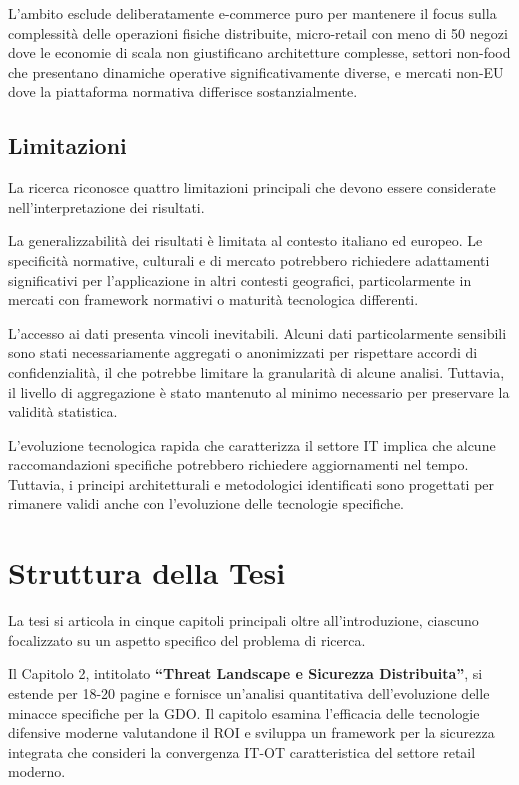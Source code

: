 \documentclass[12pt,a4paper,oneside]{book}
\numberwithin{figure}{chapter} %
\numberwithin{table}{chapter}  %
\begin{document}
L'ambito esclude deliberatamente e-commerce puro per mantenere il focus sulla complessità delle operazioni fisiche distribuite, micro-retail con meno di 50 negozi dove le economie di scala non giustificano architetture complesse, settori non-food che presentano dinamiche operative significativamente diverse, e mercati non-EU dove la piattaforma normativa differisce 
sostanzialmente.
\subsection{\texorpdfstring{\textbf{
Limitazioni}}{1.6.2 Limitazioni}}\label{limitazioni}

La ricerca riconosce quattro limitazioni principali che devono essere
considerate nell'interpretazione dei risultati.

La generalizzabilità dei risultati è limitata al contesto italiano ed
europeo. Le specificità normative, culturali e di mercato potrebbero
richiedere adattamenti significativi per l'applicazione in altri
contesti geografici, particolarmente in mercati con framework normativi o maturità tecnologica differenti.

L'accesso ai dati presenta vincoli inevitabili. Alcuni dati
particolarmente sensibili sono stati necessariamente aggregati o
anonimizzati per rispettare accordi di confidenzialità, il che potrebbe
limitare la granularità di alcune analisi. Tuttavia, il livello di
aggregazione è stato mantenuto al minimo necessario per preservare la
validità statistica.

L'evoluzione tecnologica rapida che caratterizza il settore IT implica
che alcune raccomandazioni specifiche potrebbero richiedere
aggiornamenti nel tempo. Tuttavia, i principi architetturali e
metodologici identificati sono progettati per rimanere validi anche con
l'evoluzione delle tecnologie specifiche.

\section{\texorpdfstring{\textbf{Struttura della
Tesi}}{1.7 Struttura della Tesi}}\label{struttura-della-tesi}

La tesi si articola in cinque capitoli principali oltre
all'introduzione, ciascuno focalizzato su un aspetto specifico del
problema di ricerca.

Il Capitolo 2, intitolato \textbf{``Threat Landscape e Sicurezza Distribuita''},
si estende per 18-20 pagine e fornisce un'analisi quantitativa
dell'evoluzione delle minacce specifiche per la GDO. Il capitolo esamina
l'efficacia delle tecnologie difensive moderne valutandone il ROI e
sviluppa un framework per la sicurezza integrata che consideri la
convergenza IT-OT caratteristica del settore retail moderno.
\end{document}
